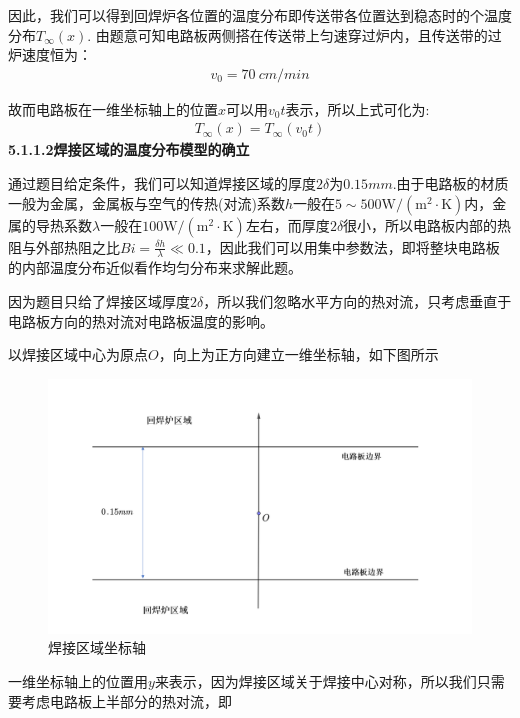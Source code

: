 \documentclass[../main.tex]{subfiles}
\begin{document}
\par 因此，我们可以得到回焊炉各位置的温度分布即传送带各位置达到稳态时的个温度分布$T_{\infty}(x)$.
由题意可知电路板两侧搭在传送带上匀速穿过炉内，且传送带的过炉速度恒为：
\begin{align}\label{1.17}
v_0=70\ cm/min
\end{align}
\par 故而电路板在一维坐标轴上的位置$x$可以用$v_0t$表示，所以上式可化为:
\begin{align}
T_{\infty}(x)=T_{\infty}(v_0t)
\end{align}
\noindent \textbf{5.1.1.2焊接区域的温度分布模型的确立}
\par 通过题目给定条件，我们可以知道焊接区域的厚度$2\delta$为$0.15mm$.由于电路板的材质一般为金属，金属板与空气的传热(对流)系数$h$一般在$5\sim 500\mathrm{W}/(\mathrm{m}^2\cdot\mathrm{K})$内，金属的导热系数$\lambda$一般在$100\mathrm{W}/(\mathrm{m}^2\cdot\mathrm{K})$左右，而厚度$2\delta$很小，所以电路板内部的热阻与外部热阻之比$Bi=\frac{\delta h}{\lambda}\ll 0.1$，因此我们可以用集中参数法，即将整块电路板的内部温度分布近似看作均匀分布来求解此题。
\par 因为题目只给了焊接区域厚度$2\delta$，所以我们忽略水平方向的热对流，只考虑垂直于电路板方向的热对流对电路板温度的影响。
\par 以焊接区域中心为原点$O$，向上为正方向建立一维坐标轴，如下图所示
\begin{figure}[H]\label{1.18}
\centering
\includegraphics[width=1\textwidth]{7.png}
\caption{焊接区域坐标轴}
\end{figure}\label{1.20}
\par 一维坐标轴上的位置用$y$来表示，因为焊接区域关于焊接中心对称，所以我们只需要考虑电路板上半部分的热对流，即
\end{document}
